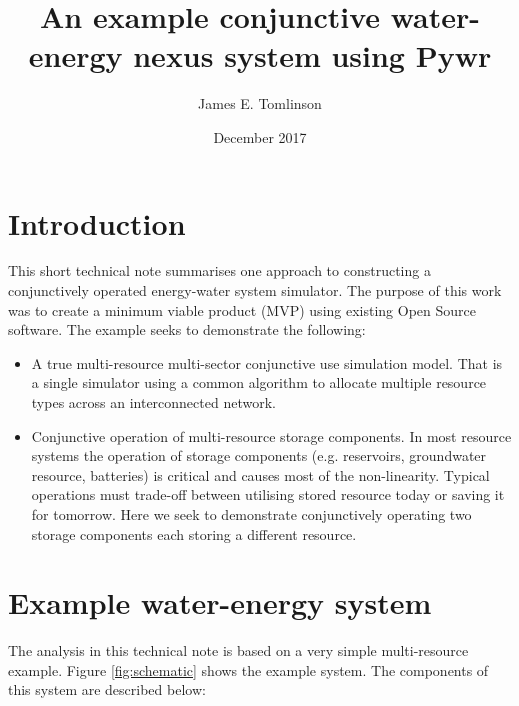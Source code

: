 \documentclass[11pt,twoside,a4paper]{article}
\begin{document}
\title{An example conjunctive water-energy nexus system using Pywr}
\author{James E. Tomlinson}
\date{December 2017}
\maketitle

\section{Introduction}

This short technical note summarises one approach to constructing a conjunctively operated energy-water system simulator. The purpose of this work was to create a minimum viable product (MVP) using existing Open Source software. The example seeks to demonstrate the following:

\begin{itemize}
    \item A true multi-resource multi-sector conjunctive use simulation model. That is a single simulator using a common algorithm to allocate multiple resource types across an interconnected network. 
    \item Conjunctive operation of multi-resource storage components. In most resource systems the operation of storage components (e.g. reservoirs, groundwater resource, batteries) is critical and causes most of the non-linearity. Typical operations must trade-off between utilising stored resource today or saving it for tomorrow. Here we seek to demonstrate conjunctively operating two storage components each storing a different resource.

\end{itemize}

\section{Example water-energy system}

The analysis in this technical note is based on a very simple multi-resource example. Figure \ref{fig:schematic} shows the example system. The components of this system are described below:
\end{document}
